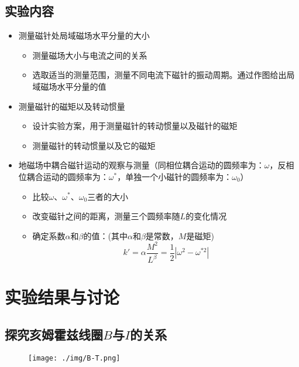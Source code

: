 \documentclass{article}
\begin{document}
\subsection{实验内容}
\begin{itemize}
    \item 测量磁针处局域磁场水平分量的大小
    \begin{itemize}
        \item 测量磁场大小与电流之间的关系
        \item 选取适当的测量范围，测量不同电流下磁针的振动周期。通过作图给出局域磁场水平分量的值
    \end{itemize}
    \item 测量磁针的磁矩以及转动惯量
    \begin{itemize}
        \item 设计实验方案，用于测量磁针的转动惯量以及磁针的磁矩
        \item 测量磁针的转动惯量以及它的磁矩
    \end{itemize}
    \item 地磁场中耦合磁针运动的观察与测量（同相位耦合运动的圆频率为：$\omega$，反相位耦合运动的圆频率为：$\omega^*$，单独一个小磁针的圆频率为：$\omega_0$）
    \begin{itemize}
        \item 比较$\omega$、$\omega^*$、$\omega_0$三者的大小
        \item 改变磁针之间的距离，测量三个圆频率随$L$的变化情况
        \item 确定系数$\alpha $和$\beta$的值：(其中$\alpha$和$\beta$是常数，$M$是磁矩)
        \begin{equation}
            k'=\alpha\frac{M^2}{L^\beta}=\frac{1}{2}\left|\omega^2-\omega^{*2}\right|
        \end{equation}
    \end{itemize}
\end{itemize}
\section{实验结果与讨论}
\subsection{探究亥姆霍兹线圈$B$与$I$的关系}

\begin{figure}[H]
    \centering
    \texttt{[image: ./img/B-T.png]}
\end{figure}
\end{document}
